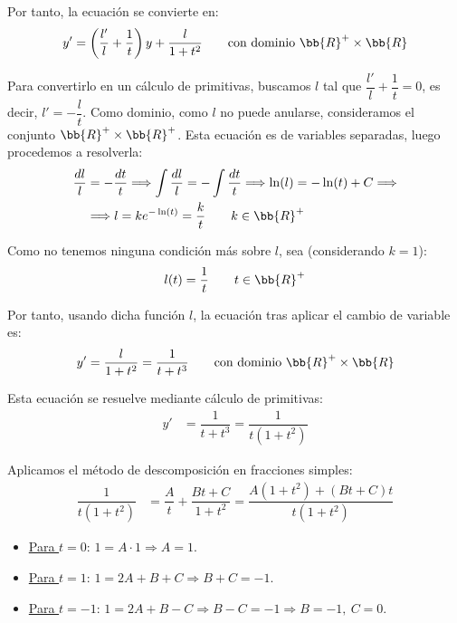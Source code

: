 \begin{ejercicio}
\begin{enumerate}
        Por tanto, la ecuación se convierte en:
        \begin{equation*}
            y' = \left(\dfrac{l'}{l} +\dfrac{1}{t}\right)y + \dfrac{l}{1+t^2}\qquad \text{con dominio }\bb{R}^+\times \bb{R}
        \end{equation*}

        Para convertirlo en un cálculo de primitivas, buscamos $l$ tal que $\dfrac{l'}{l} +\dfrac{1}{t} = 0$, es decir, $l' = -\dfrac{l}{t}$. Como dominio, como $l$ no puede anularse, consideramos el conjunto $\bb{R}^+\times \bb{R}^+$.
        Esta ecuación es de variables separadas, luego procedemos a resolverla:
        \begin{align*}
            \dfrac{dl}{l} &= -\dfrac{dt}{t} \Longrightarrow \int \dfrac{dl}{l} = -\int \dfrac{dt}{t} \Longrightarrow \ln(l) = -\ln(t) + C \Longrightarrow\\&\Longrightarrow l =  ke^{-\ln(t)} = \dfrac{k}{t} \qquad k\in \bb{R}^+
        \end{align*}

        Como no tenemos ninguna condición más sobre $l$, sea (considerando $k=1$):
        \begin{equation*}
            l(t) = \dfrac{1}{t} \qquad t\in \bb{R}^+
        \end{equation*}

        Por tanto, usando dicha función $l$, la ecuación tras aplicar el cambio de variable es:
        \begin{equation*}
            y' = \dfrac{l}{1+t^2} = \dfrac{1}{t+t^3} \qquad \text{con dominio }\bb{R}^+\times \bb{R}
        \end{equation*}

        Esta ecuación se resuelve mediante cálculo de primitivas:
        \begin{align*}
            y' &= \dfrac{1}{t+t^3} = \dfrac{1}{t(1+t^2)}
        \end{align*}

        Aplicamos el método de descomposición en fracciones simples:
        \begin{align*}
            \dfrac{1}{t(1+t^2)} &= \dfrac{A}{t} + \dfrac{Bt+C}{1+t^2} = \dfrac{A(1+t^2)+(Bt+C)t}{t(1+t^2)}
        \end{align*}
        \begin{itemize}
            \item \ul{Para $t=0$}: $1=A\cdot 1 \Longrightarrow A=1$.
            \item \ul{Para $t=1$}: $1=2A+B+C \Longrightarrow B+C=-1$.
            \item \ul{Para $t=-1$}: $1=2A+B-C \Longrightarrow B-C=-1\Longrightarrow B=-1,~C=0$.
        \end{itemize}


\end{enumerate}
\end{ejercicio}
